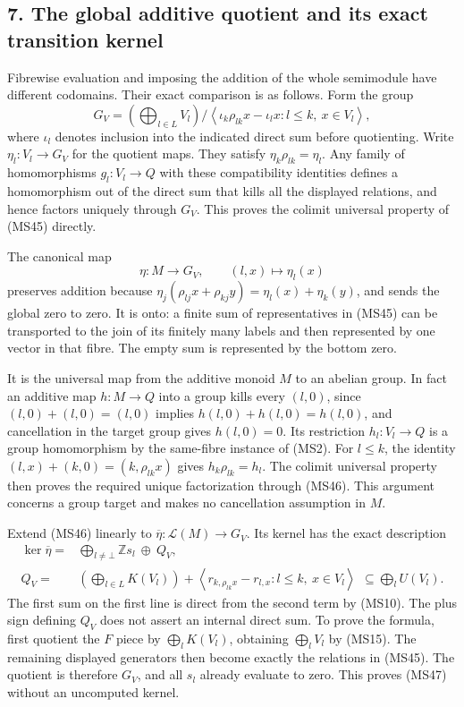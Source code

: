 \documentclass[
]{article}
\begin{document}
\subsection{7. The global additive quotient and its exact transition
kernel}\label{the-global-additive-quotient-and-its-exact-transition-kernel}

Fibrewise evaluation and imposing the addition of the whole semimodule
have different codomains. Their exact comparison is as follows. Form the
group \[
G_V=\left(\bigoplus_{l\in L}V_l\right)
\Big/
\left\langle\iota_k\rho_{lk}x-\iota_lx:
l\le k,\ x\in V_l\right\rangle,
\tag{MS45}
\] where \(\iota_l\) denotes inclusion into the indicated direct sum
before quotienting. Write \(\eta_l:V_l\to G_V\) for the quotient maps.
They satisfy \(\eta_k\rho_{lk}=\eta_l\). Any family of homomorphisms
\(g_l:V_l\to Q\) with these compatibility identities defines a
homomorphism out of the direct sum that kills all the displayed
relations, and hence factors uniquely through \(G_V\). This proves the
colimit universal property of (MS45) directly.

The canonical map \[
\eta:M\longrightarrow G_V,\qquad (l,x)\longmapsto\eta_l(x)
\tag{MS46}
\] preserves addition because
\(\eta_j(\rho_{lj}x+\rho_{kj}y)=\eta_l(x)+\eta_k(y)\), and sends the
global zero to zero. It is onto: a finite sum of representatives in
(MS45) can be transported to the join of its finitely many labels and
then represented by one vector in that fibre. The empty sum is
represented by the bottom zero.

It is the universal map from the additive monoid \(M\) to an abelian
group. In fact an additive map \(h:M\to Q\) into a group kills every
\((l,0)\), since \((l,0)+(l,0)=(l,0)\) implies \(h(l,0)+h(l,0)=h(l,0)\),
and cancellation in the target group gives \(h(l,0)=0\). Its restriction
\(h_l:V_l\to Q\) is a group homomorphism by the same-fibre instance of
(MS2). For \(l\le k\), the identity \((l,x)+(k,0)=(k,\rho_{lk}x)\) gives
\(h_k\rho_{lk}=h_l\). The colimit universal property then proves the
required unique factorization through (MS46). This argument concerns a
group target and makes no cancellation assumption in \(M\).

Extend (MS46) linearly to \(\overline\eta:\mathscr L(M)\to G_V\). Its
kernel has the exact description \[
\begin{split}
\ker\overline\eta
={}&\bigoplus_{l\ne\bot}\mathbb Zs_l\ \oplus\ Q_V,\\
Q_V
={}&\left(\bigoplus_{l\in L}K(V_l)\right)
+\left\langle r_{k,\rho_{lk}x}-r_{l,x}:
l\le k,\ x\in V_l\right\rangle
\ \,\subseteq\bigoplus_l U(V_l).
\end{split}
\tag{MS47}
\] The first sum on the first line is direct from the second term by
(MS10). The plus sign defining \(Q_V\) does not assert an internal
direct sum. To prove the formula, first quotient the \(F\) piece by
\(\bigoplus_lK(V_l)\), obtaining \(\bigoplus_lV_l\) by (MS15). The
remaining displayed generators then become exactly the relations in
(MS45). The quotient is therefore \(G_V\), and all \(s_l\) already
evaluate to zero. This proves (MS47) without an uncomputed kernel.
\end{document}

